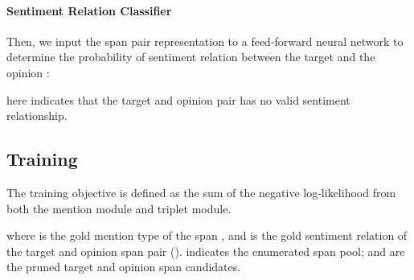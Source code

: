 \documentclass[11pt,a4paper]{article}
\begin{document}
\paragraph{Sentiment Relation Classifier}
Then, we input the span pair representation  to a feed-forward neural network to determine the probability of sentiment relation  between the target  and the opinion :

 here indicates that the target and opinion pair has no valid sentiment relationship.

























\subsection{Training}
\label{loss}
The training objective is defined as the sum of the negative log-likelihood from both the mention module and triplet module.

where  is the gold mention type of the span , and  is the gold sentiment relation of the target and opinion span pair ().   indicates the enumerated span pool;  and  are the pruned target and opinion span candidates. 
\end{document}
